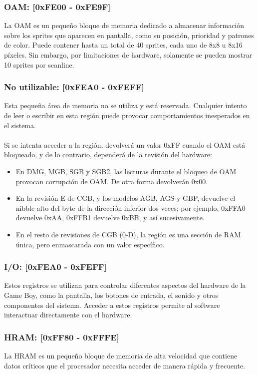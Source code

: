 \subsubsection{OAM: [0xFE00 - 0xFE9F]}
La OAM es un pequeño bloque de memoria dedicado a almacenar información sobre los sprites que aparecen en pantalla, como su posición, prioridad y patrones de color. Puede contener hasta un total de 40 sprites, cada uno de 8x8 u 8x16 píxeles. Sin embargo, por limitaciones de hardware, solamente se pueden mostrar 10 sprites por scanline.

\subsubsection{No utilizable: [0xFEA0 - 0xFEFF]}
Esta pequeña área de memoria no se utiliza y está reservada. Cualquier intento de leer o escribir en esta región puede provocar comportamientos inesperados en el sistema.
\\\\
Si se intenta acceder a la región, devolverá un valor 0xFF cuando el OAM está bloqueado, y de lo contrario, dependerá de la revisión del hardware:

\begin{itemize}
    \item En DMG, MGB, SGB y SGB2, las lecturas durante el bloqueo de OAM provocan corrupción de OAM. De otra forma devolverán 0x00.
    \item En la revisión E de CGB, y los modelos AGB, AGS y GBP, devuelve el nibble alto del byte de la dirección inferior dos veces; por ejemplo, 0xFFA0 devuelve 0xAA, 0xFFB1 devuelve 0xBB, y así sucesivamente.
    \item En el resto de revisiones de CGB (0-D), la región es una sección de RAM única, pero enmascarada con un valor específico.
\end{itemize}

\subsubsection{I/O: [0xFEA0 - 0xFEFF]}
Estos registros se utilizan para controlar diferentes aspectos del hardware de la Game Boy, como la pantalla, los botones de entrada, el sonido y otros componentes del sistema. Acceder a estos registros permite al software interactuar directamente con el hardware.

\subsubsection{HRAM: [0xFF80 - 0xFFFE]}
La HRAM es un pequeño bloque de memoria de alta velocidad que contiene datos críticos que el procesador necesita acceder de manera rápida y frecuente.

